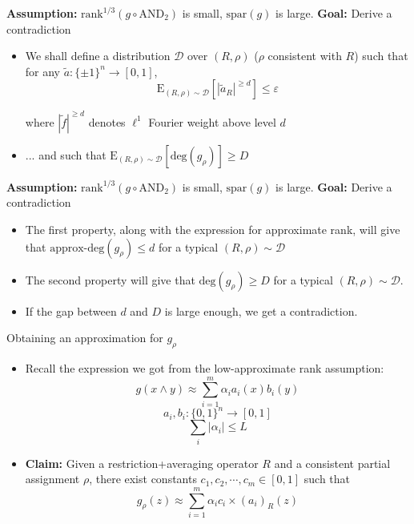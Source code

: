 \begin{frame}
	\textbf{Assumption: }$\text{rank}^{1/3} (g \circ \text{AND}_2)$ is small, $\text{spar}(g)$ is large. \newline
	\textbf{Goal: }Derive a contradiction
	\begin{itemize}
		\item<1-> We shall define a distribution $\mathcal{D}$ over $(R,\rho)$ ($\rho$ consistent with $R$) such that for any $\tilde{a}: \{ \pm 1\}^n \rightarrow [0,1]$,
		$$ \text{E}_{(R,\rho) \sim \mathcal{D}} [ |\tilde{a}_{R}|^{\geq d}] \leq \varepsilon$$
		
		where $|\tilde{f}|^{\geq d}$ denotes $\ell^1$ Fourier weight above level $d$
		\item<2-> ... and such that $\text{E}_{(R,\rho) \sim \mathcal{D}}[\text{deg}( g_{\rho})] \geq D$
	\end{itemize}	
	
\end{frame}

\begin{frame}
	\textbf{Assumption: }$\text{rank}^{1/3} (g \circ \text{AND}_2)$ is small, $\text{spar}(g)$ is large. \newline
\textbf{Goal: }Derive a contradiction
	\begin{itemize}
		\item<1-> The first property, along with the expression for approximate rank, will give that $\text{approx-deg}(g_{\rho}) \leq d$ for a typical $(R, \rho) \sim \mathcal{D}$
		\item<2-> The second property will give that $\text{deg}(g_{\rho}) \geq D$ for a typical $(R, \rho) \sim \mathcal{D}$.
		\item<3-> If the gap between $d$ and $D$ is large enough, we get a contradiction.
	\end{itemize}	
	
\end{frame}


\begin{frame}{Obtaining an approximation for $g_{\rho}$}
\begin{itemize}
	\item<1-> Recall the expression we got from the low-approximate rank assumption:
	$$ g(x \land y) \approx \displaystyle \sum_{i=1}^{m} \alpha_i a_i(x) b_i(y)$$
	$$ a_i, b_i: \{0,1\}^n \rightarrow [0,1]$$
	$$ \displaystyle \sum_i |\alpha_i| \leq L$$
	\item<2-> \textbf{Claim: }Given a restriction+averaging operator $R$ and a consistent partial assignment $\rho$, there exist constants $c_1, c_2, \cdots , c_m \in [0,1]$ such that
	$$ g_{\rho} (z) \approx \displaystyle \sum_{i=1}^{m} \alpha_i c_i \times (a_i)_{R} (z)$$

\end{itemize}	

\end{frame}

